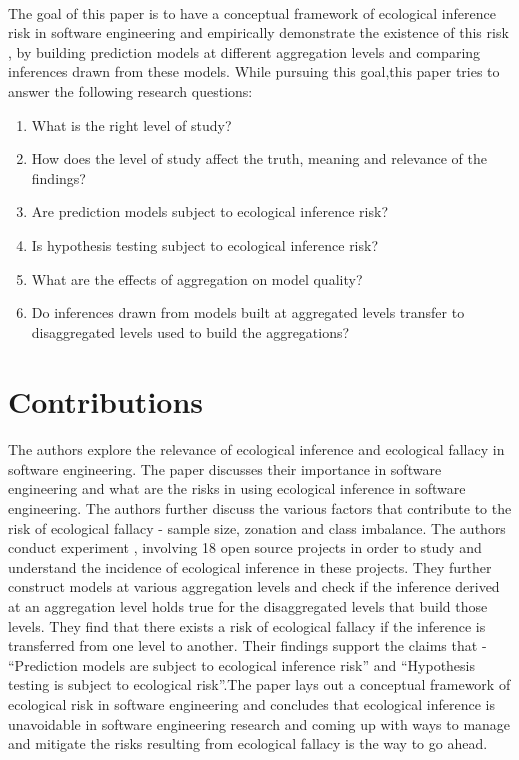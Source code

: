 \documentclass[12pt]{article}
\begin{document}
\paragraph{}The goal of this paper is to have a conceptual framework of ecological inference risk in software engineering and empirically demonstrate the existence of this risk , by building
  prediction models at different aggregation levels and comparing inferences drawn from these models. While pursuing this goal,this paper tries to answer the following research questions:
\begin{enumerate}
  \item What is the right level of study?
  \item How does the level of study affect the truth, meaning and relevance of the findings?
  \item Are prediction models subject to ecological inference risk?
  \item Is hypothesis testing subject to ecological inference risk?
  \item What are the effects of aggregation on model quality?
  \item Do inferences drawn from models built at aggregated levels transfer to disaggregated levels used to build the aggregations?
\end{enumerate}


\section{Contributions}\label{contrib}
\paragraph{} The authors explore the relevance of ecological inference and ecological fallacy in software engineering. The paper discusses their importance in software engineering and 
what are the risks in using ecological inference in software engineering. The authors further discuss the various factors that contribute to the risk of ecological fallacy - sample size,
zonation and class imbalance. The authors conduct experiment , involving 18 open source projects in order to study and understand the incidence of ecological inference in these projects.
They further construct models at various aggregation levels and check if the inference derived at an aggregation level holds true for the disaggregated levels that build those levels. They find
that there exists a risk of ecological fallacy if the inference is transferred from one level to another. Their findings support the claims that - ``Prediction models are subject to ecological
inference risk'' and ``Hypothesis testing is subject to ecological risk''.The paper lays out a conceptual framework of ecological risk in software engineering and concludes that ecological
inference is unavoidable in software engineering research and coming up with ways to manage and mitigate the risks resulting from ecological fallacy is the way to go ahead.
\end{document}
